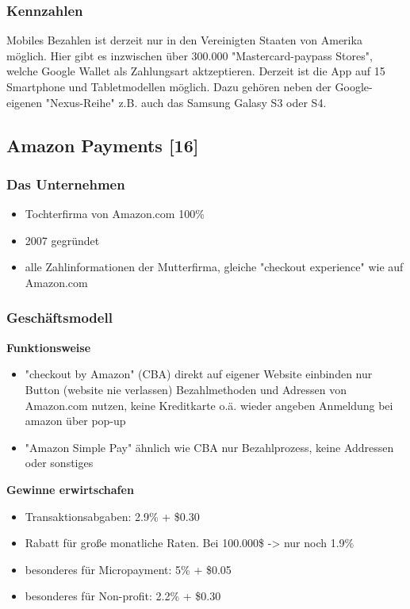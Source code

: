 \subsubsection{ Kennzahlen}
Mobiles Bezahlen ist derzeit nur in den Vereinigten Staaten von Amerika möglich. Hier gibt es inzwischen über 300.000 "Mastercard-paypass Stores", welche Google Wallet als Zahlungsart aktzeptieren.
Derzeit ist die App auf 15 Smartphone und Tabletmodellen möglich. Dazu gehören neben der Google-eigenen "Nexus-Reihe" z.B. auch das Samsung Galasy S3 oder S4. 


\subsection{ Amazon Payments [16]}
\subsubsection{ Das Unternehmen}
	\begin{itemize}
	\item Tochterfirma von Amazon.com 100\%
	\item 2007 gegründet
	\item alle Zahlinformationen der Mutterfirma, gleiche "checkout experience" wie auf Amazon.com
	\end{itemize}


\subsubsection{ Geschäftsmodell}
\textbf{Funktionsweise}\\
	\begin{itemize}
	\item "checkout by Amazon" (CBA)
	\subitem  direkt auf eigener Website einbinden nur Button (website nie verlassen)
	\subitem  Bezahlmethoden und Adressen von Amazon.com nutzen, keine Kreditkarte o.ä. wieder angeben
	\subitem  Anmeldung bei amazon über pop-up
	\item "Amazon Simple Pay"
	\subitem  ähnlich wie CBA
	\subitem  nur Bezahlprozess, keine Addressen oder sonstiges
	\end{itemize}
	
\textbf{Gewinne erwirtschafen}\\
	\begin{itemize}
	\item Transaktionsabgaben: 2.9\% + \$0.30
	\item Rabatt für große monatliche Raten. Bei 100.000\$ -> nur noch 1.9\%
	\item besonderes für Micropayment: 5\% + \$0.05
	\item besonderes für Non-profit: 2.2\% + \$0.30
	\end{itemize}


